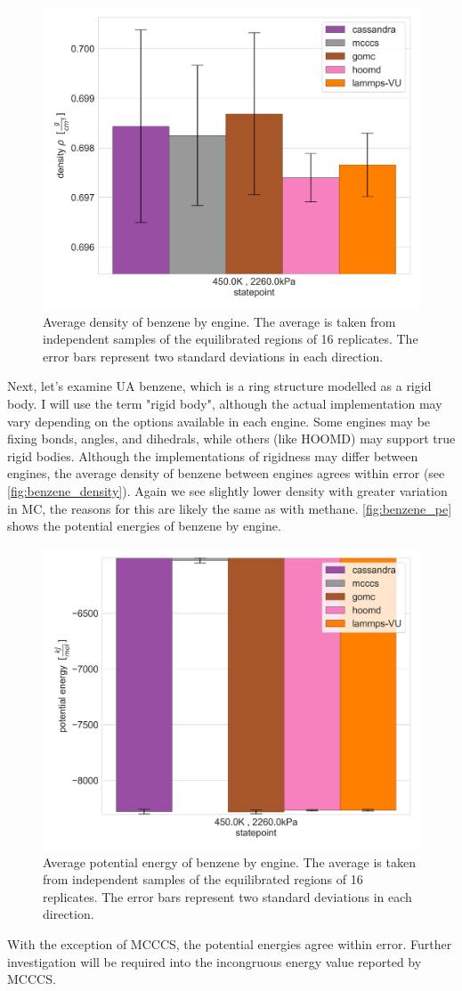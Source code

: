 \begin{figure}[h!]
    \centering
    \includegraphics[width=0.6\linewidth,keepaspectratio]{figures/rep_study/benzeneUA_summary.png}
    \caption{Average density of benzene by engine. The average is taken from independent samples of the equilibrated regions of 16 replicates. The error bars represent two standard deviations in each direction.}\label{fig:benzene_density}
\end{figure}
Next, let's examine UA benzene, which is a ring structure modelled as a rigid body. 
I will use the term "rigid body", although the actual implementation may vary depending on the options available in each engine.
Some engines may be fixing bonds, angles, and dihedrals, while others (like HOOMD) may support true rigid bodies.
Although the implementations of rigidness may differ between engines, the average density of benzene between engines agrees within error (see \autoref{fig:benzene_density}).
Again we see slightly lower density with greater variation in MC, the reasons for this are likely the same as with methane. %
\autoref{fig:benzene_pe} shows the potential energies of benzene by engine.
\begin{figure}[h!]
    \centering
    \includegraphics[width=0.6\linewidth,keepaspectratio]{figures/rep_study/benzeneUA_pe_summary.png}
    \caption{Average potential energy of benzene by engine. The average is taken from independent samples of the equilibrated regions of 16 replicates. The error bars represent two standard deviations in each direction.}\label{fig:benzene_pe}
\end{figure}
With the exception of MCCCS, the potential energies agree within error. 
Further investigation will be required into the incongruous energy value reported by MCCCS.

